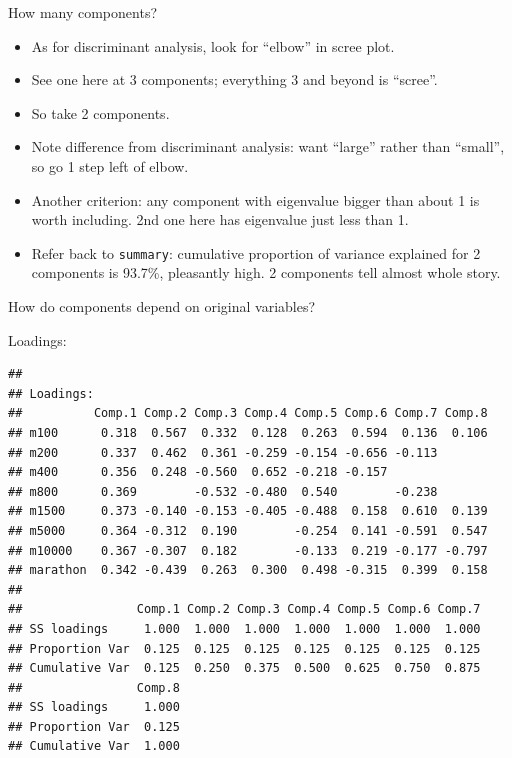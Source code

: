 \documentclass[
  ignorenonframetext,
]{beamer}
\newenvironment{Shaded}{\begin{snugshade}}{\end{snugshade}}
\newcommand{\NormalTok}[1]{#1}
\newcommand{\OperatorTok}[1]{\textcolor[rgb]{0.81,0.36,0.00}{\textbf{#1}}}
\begin{document}
\begin{frame}[fragile]{How many components?}
\protect\hypertarget{how-many-components}{}

\begin{itemize}
\item
  As for discriminant analysis, look for ``elbow'' in scree plot.
\item
  See one here at 3 components; everything 3 and beyond is ``scree''.
\item
  So take 2 components.
\item
  Note difference from discriminant analysis: want ``large'' rather than
  ``small'', so go 1 step left of elbow.
\item
  Another criterion: any component with eigenvalue bigger than about 1
  is worth including. 2nd one here has eigenvalue just less than 1.
\item
  Refer back to \texttt{summary}: cumulative proportion of variance
  explained for 2 components is 93.7\%, pleasantly high. 2 components
  tell almost whole story.
\end{itemize}

\end{frame}

\begin{frame}[fragile]{How do components depend on original variables?}
\protect\hypertarget{how-do-components-depend-on-original-variables}{}

Loadings:

\footnotesize

\begin{Shaded}
\end{Shaded}

\begin{verbatim}
## 
## Loadings:
##          Comp.1 Comp.2 Comp.3 Comp.4 Comp.5 Comp.6 Comp.7 Comp.8
## m100      0.318  0.567  0.332  0.128  0.263  0.594  0.136  0.106
## m200      0.337  0.462  0.361 -0.259 -0.154 -0.656 -0.113       
## m400      0.356  0.248 -0.560  0.652 -0.218 -0.157              
## m800      0.369        -0.532 -0.480  0.540        -0.238       
## m1500     0.373 -0.140 -0.153 -0.405 -0.488  0.158  0.610  0.139
## m5000     0.364 -0.312  0.190        -0.254  0.141 -0.591  0.547
## m10000    0.367 -0.307  0.182        -0.133  0.219 -0.177 -0.797
## marathon  0.342 -0.439  0.263  0.300  0.498 -0.315  0.399  0.158
## 
##                Comp.1 Comp.2 Comp.3 Comp.4 Comp.5 Comp.6 Comp.7
## SS loadings     1.000  1.000  1.000  1.000  1.000  1.000  1.000
## Proportion Var  0.125  0.125  0.125  0.125  0.125  0.125  0.125
## Cumulative Var  0.125  0.250  0.375  0.500  0.625  0.750  0.875
##                Comp.8
## SS loadings     1.000
## Proportion Var  0.125
## Cumulative Var  1.000
\end{verbatim}

\normalsize

\end{frame}
\end{document}
